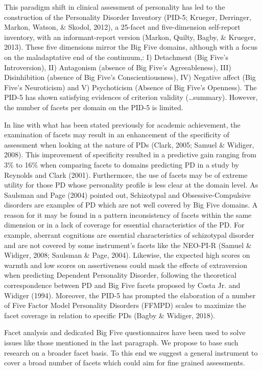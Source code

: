 \documentclass[,man,floatsintext]{apa6}
\theoremstyle{definition}
\theoremstyle{definition}
\theoremstyle{definition}
\theoremstyle{remark}
\begin{document}
This paradigm shift in clinical assessment of personality has led to the
construction of the Personality Disorder Inventory (PID-5; Krueger,
Derringer, Markon, Watson, \& Skodol, 2012), a 25-facet and
five-dimension self-report inventory, with an informant-report version
(Markon, Quilty, Bagby, \& Krueger, 2013). These five dimensions mirror
the Big Five domains, although with a focus on the maladaptative end of
the continuum,: I) Detachment (Big Five's Introversion), II) Antagonism
(absence of Big Five's Agreeableness), III) Disinhibition (absence of
Big Five's Conscientiousness), IV) Negative affect (Big Five's
Neuroticism) and V) Psychoticism (Absence of Big Five's Openness). The
PID-5 has shown satisfying evidences of criterion validity
(\ldots{}summary). However, the number of facets per domain on the PID-5
is limited.

In line with what has been stated previously for academic achievement,
the examination of facets may result in an enhancement of the
specificity of assessment when looking at the nature of PDs (Clark,
2005; Samuel \& Widiger, 2008). This improvement of specificity resulted
in a predictive gain ranging from 3\% to 16\% when comparing facets to
domains predicting PD in a study by Reynolds and Clark (2001).
Furthermore, the use of facets may be of extreme utility for those PD
whose personality profile is less clear at the domain level. As Saulsman
and Page (2004) pointed out, Schizotypal and Obsessive-Compulsive
disorders are examples of PD which are not well covered by Big Five
domains. A reason for it may be found in a pattern inconsistency of
facets within the same dimension or in a lack of coverage for essential
characteristics of the PD. For example, aberrant cognitions are
essential characteristics of schizotypal disorder and are not covered by
some instrument's facets like the NEO-PI-R (Samuel \& Widiger, 2008;
Saulsman \& Page, 2004). Likewise, the expected high scores on warmth
and low scores on assertiveness could mask the effects of extraversion
when predicting Dependent Personality Disorder, following the
theoretical correspondence between PD and Big Five facets proposed by
Costa Jr. and Widiger (1994). Moreover, the PID-5 has prompted the
elaboration of a number of Five Factor Model Personality Disorders
(FFMPD) scales to maximize the facet coverage in relation to specific
PDs (Bagby \& Widiger, 2018).

Facet analysis and dedicated Big Five questionnaires have been used to
solve issues like those mentioned in the last paragraph. We propose to
base such research on a broader facet basis. To this end we suggest a
general instrument to cover a broad number of facets which could aim for
fine grained assessments.
\end{document}
